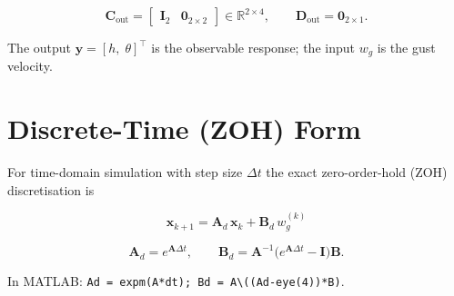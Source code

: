 \documentclass[11pt, a4paper]{article}
\begin{document}
\begin{equation}
  \mathbf{C}_{\text{out}} =
  \begin{bmatrix} \mathbf{I}_2 & \mathbf{0}_{2\times2} \end{bmatrix}
  \in\mathbb{R}^{2\times4},
  \qquad
  \mathbf{D}_{\text{out}} = \mathbf{0}_{2\times1}.
\end{equation}

The output $\mathbf{y} = [h,\;\theta]^\top$ is the observable response;
the input $w_g$ is the gust velocity.

\section*{Discrete-Time (ZOH) Form}

For time-domain simulation with step size $\Delta t$ the exact
zero-order-hold (ZOH) discretisation is

\begin{equation}
  \mathbf{x}_{k+1} = \mathbf{A}_d\,\mathbf{x}_k + \mathbf{B}_d\,w_g^{(k)}
\end{equation}

\begin{equation}
  \mathbf{A}_d = e^{\mathbf{A}\Delta t},
  \qquad
  \mathbf{B}_d = \mathbf{A}^{-1}\!\bigl(e^{\mathbf{A}\Delta t} - \mathbf{I}\bigr)\mathbf{B}.
\end{equation}

In MATLAB: \texttt{Ad = expm(A*dt);\; Bd = A\textbackslash((Ad-eye(4))*B)}.
\end{document}

